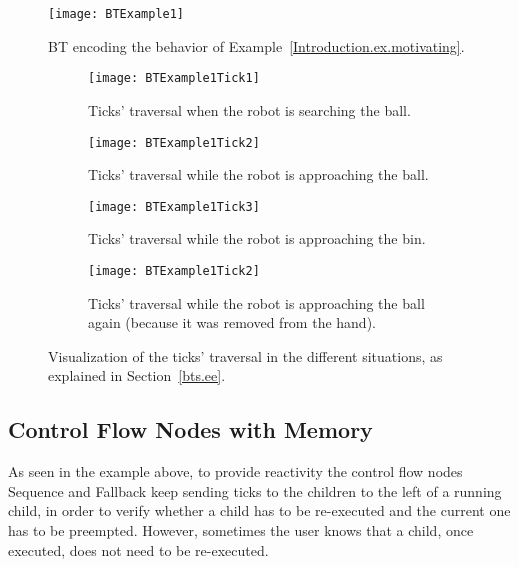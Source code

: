 
\begin{figure}[h!]
\centering
\texttt{[image: BTExample1]}
\caption{BT encoding the behavior of Example~\ref{Introduction.ex.motivating}.}
\label{bts.fig.btmot}
\end{figure}

\begin{figure}[h!]
\centering
\begin{subfigure}[b]{\columnwidth}
\texttt{[image: BTExample1Tick1]}
\caption{Ticks' traversal when the robot is searching the ball.}
\label{bts.fig.btmot1}
\end{subfigure}

\begin{subfigure}[b]{\columnwidth}
\texttt{[image: BTExample1Tick2]}
\caption{Ticks'  traversal while the robot is approaching the ball.}
\label{bts.fig.btmot2}
\end{subfigure}

\begin{subfigure}[b]{\columnwidth}
\texttt{[image: BTExample1Tick3]}
\caption{Ticks'  traversal while the robot is approaching the bin.}
\label{bts.fig.btmot3}
\end{subfigure}

\begin{subfigure}[b]{\columnwidth}
\texttt{[image: BTExample1Tick2]}
\caption{Ticks'  traversal while the robot is approaching the ball again (because it was removed from the hand).}
\label{bts.fig.btmot4}
\end{subfigure}
\caption{Visualization of the ticks' traversal in the different situations, as explained in Section~\ref{bts.ee}.}
\label{bts.fig.btmot1to4}
\end{figure}




\subsection{Control Flow Nodes with Memory}
\label{bt:sec:mem}
As seen in the example above, to provide reactivity
the control flow nodes Sequence and Fallback keep sending ticks to the children to the left of a running child, in order to verify whether a child has to be re-executed and the current one has to be preempted. 
However, sometimes the user knows that a child, once executed, does not need to be re-executed.

